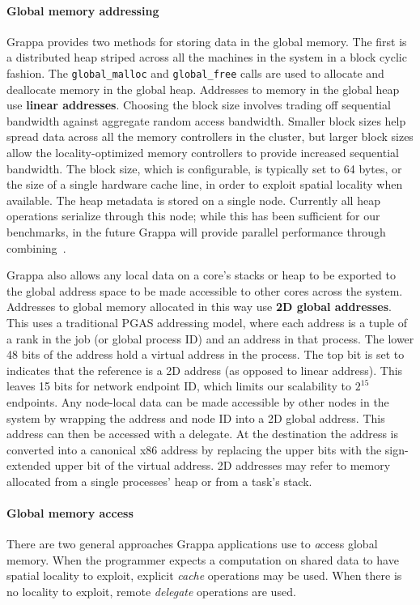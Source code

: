 \paragraph{Global memory addressing} Grappa provides two methods for storing data in the global memory. The first is a distributed heap striped across all the machines in the system in a block cyclic fashion. The \texttt{global\_malloc} and \texttt{global\_free} calls are used to allocate and deallocate memory in the global heap.  Addresses to memory in the global heap use \textbf{linear addresses}.  Choosing the block size involves trading off sequential bandwidth against aggregate random access bandwidth. Smaller block sizes help spread data across all the memory controllers in the cluster, but larger block sizes allow the locality-optimized memory controllers to provide increased sequential bandwidth. The block size, which is configurable, is typically set to 64 bytes, or the size of a single hardware cache line, in order to exploit spatial locality when available. The heap metadata is stored on a single node. Currently all heap operations serialize through this node; while this has been sufficient for our benchmarks, in the future Grappa will provide parallel performance through combining~\cite{MAMA,flatcombining}.

Grappa also allows any local data on a core's stacks or heap to be exported to the global address space to be made accessible to other cores across the system. Addresses to global memory allocated in this way use \textbf{2D global addresses}.  This uses a traditional PGAS addressing model, where each address is a tuple of a rank in the job (or global process ID) and an address in that process. The lower 48 bits of the address hold a virtual address in the process. The top bit is set to indicates that the reference is a 2D address (as opposed to linear address). This leaves 15 bits for network endpoint ID, which limits our scalability to $2^{15}$ endpoints. Any node-local data can be made accessible by other nodes in the system by wrapping the address and node ID into a 2D global address. This address can then be accessed with a delegate.
At the destination the address is converted into a canonical x86 address by replacing the upper bits with the sign-extended upper bit of the virtual address. 2D addresses may refer to memory allocated from a single processes' heap or from a task's stack.

\paragraph{Global memory access} There are two general approaches Grappa applications use to {\emph access} global memory. When the programmer expects a computation on shared data to have spatial locality to exploit, explicit {\em cache} operations may be used. When there is no locality to exploit, remote {\em delegate} operations are used.

